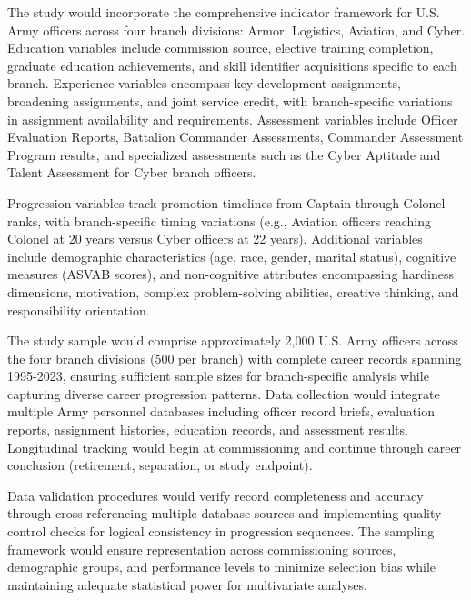 \documentclass[main.tex]{subfiles}
\begin{document}

The study would incorporate the comprehensive indicator framework for U.S. Army officers across four branch divisions: Armor, Logistics, Aviation, and Cyber. Education variables include commission source, elective training completion, graduate education achievements, and skill identifier acquisitions specific to each branch. Experience variables encompass key development assignments, broadening assignments, and joint service credit, with branch-specific variations in assignment availability and requirements. Assessment variables include Officer Evaluation Reports, Battalion Commander Assessments, Commander Assessment Program results, and specialized assessments such as the Cyber Aptitude and Talent Assessment for Cyber branch officers.

Progression variables track promotion timelines from Captain through Colonel ranks, with branch-specific timing variations (e.g., Aviation officers reaching Colonel at 20 years versus Cyber officers at 22 years). Additional variables include demographic characteristics (age, race, gender, marital status), cognitive measures (ASVAB scores), and non-cognitive attributes encompassing hardiness dimensions, motivation, complex problem-solving abilities, creative thinking, and responsibility orientation\parencite{potential2024}.


The study sample would comprise approximately 2,000 U.S. Army officers across the four branch divisions (500 per branch) with complete career records spanning 1995-2023, ensuring sufficient sample sizes for branch-specific analysis while capturing diverse career progression patterns. Data collection would integrate multiple Army personnel databases including officer record briefs, evaluation reports, assignment histories, education records, and assessment results. Longitudinal tracking would begin at commissioning and continue through career conclusion (retirement, separation, or study endpoint).

Data validation procedures would verify record completeness and accuracy through cross-referencing multiple database sources and implementing quality control checks for logical consistency in progression sequences. The sampling framework would ensure representation across commissioning sources, demographic groups, and performance levels to minimize selection bias while maintaining adequate statistical power for multivariate analyses.
\end{document}
